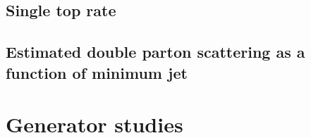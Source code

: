 \documentclass[12pt]{ucbthesis}
\begin{document}
\section{Single top rate}
\label{app:unfoldwt}


\section{Estimated double parton scattering as a function of minimum jet \pt}
\label{app:dps}

\chapter{Generator studies}
\label{app:evtgen}


\backmatter


\end{document}

